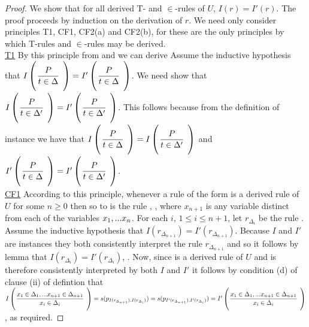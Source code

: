 \begin{proof}
We show that for all derived  T- and $\in$-rules of $U$, $I(r)=I'(r)$.  
The proof proceeds by induction on the derivation of $r$. 
We need only consider principles T1, CF1, CF2(a) and CF2(b), for these are the only principles by which  T-rules and $\in$-rules may be derived.\\
\underline{T1}
By this principle from  and  we can derive 
Assume the inductive hypothesis that $\Imap{\gatdisplayrule{P}{\ofT{t}{\Delta}}} = \Ipmap{\gatdisplayrule{P}{\ofT{t}{\Delta}}}$.
We need show that $\Imap{\gatdisplayrule{P}{\ofT{t}{\Delta'}}} = \Ipmap{\gatdisplayrule{P}{\ofT{t}{\Delta'}}}$.
This follows because from the definition of instance we have that $\Imap{\gatdisplayrule{P}{\ofT{t}{\Delta}}} = \Imap{\gatdisplayrule{P}{\ofT{t}{\Delta'}}}$
and $\Ipmap{\gatdisplayrule{P}{\ofT{t}{\Delta}}} = \Ipmap{\gatdisplayrule{P}{\ofT{t}{\Delta'}}}$.
\\

\underline{CF1} According to this principle, 
whenever a rule of the form  is a derived rule of $U$ for some $n \geq 0$
then so to is the rule , \foreachi[n+1], where $x_{n+1}$ is any variable distinct from each of the variables $x_1,...x_n$. For each $i$, $1 \leq i \leq n+1$, let $r_{\Delta_i}$ be the rule . Assume the inductive hypothesis that
$I(r_{\Delta_{n+1}})=I'(r_{\Delta_{n+1}})$. Because $I$ and $I'$ are instances they both consistently interpret the rule $r_{\Delta_{n+1}}$
and so it follows by lemma  that
$I(r_{\Delta_i})=I'(r_{\Delta_i})$, \foreachi. Now, since  is a derived rule
of $U$ and is therefore consistently interpreted by both $I$ and $I'$
it follows by condition (d) of clause (ii) of defintion  that
$
\Imap{\gatdisplayrule{\xDelta{n+1}}{\ofT{x_i}{\Delta_{i}}}}
=s(p_{I(r_{\Delta_{n+1}}),I(r_{\Delta_{i}})})
=s(p_{I'(r_{\Delta_{n+1}}),I'(r_{\Delta_{i}})})
=\Ipmap{\gatdisplayrule{\xDelta{n+1}}{\ofT{x_i}{\Delta_{i}}}}
$, as required.




\end{proof}

